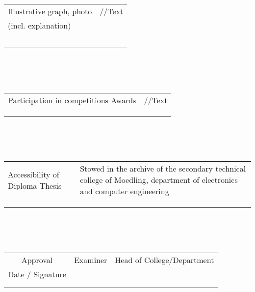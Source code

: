 \\
\\
\\
\noindent
\begin{tabularx}{\textwidth}{|m{}|X|}
	\hline
	Illustrative graph, photo & //Text \\
	(incl. explanation)&\\
	&\\
	&\\
	&\\
	&\\
	&\\
	
	\hline
	
\end{tabularx}
\\
\\
\\
\noindent
\begin{tabularx}{\textwidth}{|m{}|X|}
	\hline
	Participation in competitions Awards & //Text \\
	&\\
	&\\
	&\\
	
	
	\hline
	
\end{tabularx}
\\
\\
\\
\noindent
\begin{tabularx}{\textwidth}{|m{}|X|}
	\hline
	Accessibility of Diploma Thesis & Stowed in the archive of the secondary technical college of Moedling, department of electronics and computer engineering \\
	&\\
	&\\
	&\\
	
	
	\hline
	
\end{tabularx}
\\
\\
\\
\noindent
\begin{tabularx}{\textwidth}{|c|r|Y|}
	\hline
	Approval & \footnotesize{ Examiner } & Head of College/Department \\
	\small{Date / Signature} &  & \\
	&&\\
	&&\\
	
	
	\hline
	
\end{tabularx}
